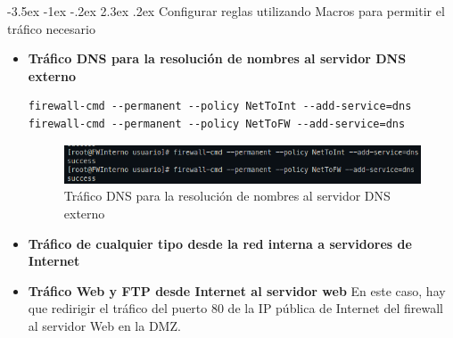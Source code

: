 \documentclass[11pt]{report}
\makeatletter
\renewcommand\chapter{\@startsection{chapter}{0}{\z@}%
    {-3.5ex \@plus -1ex \@minus -.2ex}%
    {2.3ex \@plus.2ex}%
    {\normalfont\Large\bfseries}}
\makeatother
\begin{document}
\chapter{Configurar reglas utilizando Macros para permitir el tráfico necesario}
\begin{itemize}
  \item \textbf{Tráfico DNS para la resolución de nombres al servidor DNS externo}
  \begin{verbatim}
firewall-cmd --permanent --policy NetToInt --add-service=dns
firewall-cmd --permanent --policy NetToFW --add-service=dns
  \end{verbatim}

  \begin{figure}[H]
    \centering
    \includegraphics[scale=0.75]{img/dns.png}
    \caption{Tráfico DNS para la resolución de nombres al servidor DNS externo}
  \end{figure}

  \item \textbf{Tráfico de cualquier tipo desde la red interna a servidores de Internet}

  \item \textbf{Tráfico Web y FTP desde Internet al servidor web}
  En este caso, hay que redirigir el tráfico del puerto 80 de la IP pública de Internet del
  firewall al servidor Web en la DMZ. 


\end{itemize}
\end{document}
